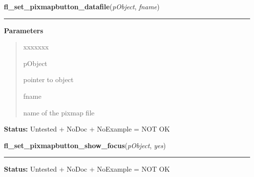     \vspace{0.5ex}

\hspace{.8\funcindent}\begin{boxedminipage}{\funcwidth}

    \raggedright \textbf{fl\_set\_pixmapbutton\_datafile}(\textit{pObject}, \textit{fname})

    \vspace{-1.5ex}

    \rule{\textwidth}{0.5\fboxrule}
\setlength{\parskip}{2ex}
\setlength{\parskip}{1ex}
      \textbf{Parameters}
      \vspace{-1ex}

      \begin{quote}
        \begin{Ventry}{xxxxxxx}

          \item[pObject]

          pointer to object

          \item[fname]

          name of the pixmap file

        \end{Ventry}

      \end{quote}

\textbf{Status:} Untested + NoDoc + NoExample = NOT OK



    \end{boxedminipage}

    \label{xformslib:library:fl_set_pixmapbutton_focus_outline}

    \vspace{0.5ex}

\hspace{.8\funcindent}\begin{boxedminipage}{\funcwidth}

    \raggedright \textbf{fl\_set\_pixmapbutton\_show\_focus}(\textit{pObject}, \textit{yes})

    \vspace{-1.5ex}

    \rule{\textwidth}{0.5\fboxrule}
\setlength{\parskip}{2ex}
\setlength{\parskip}{1ex}
\textbf{Status:} Untested + NoDoc + NoExample = NOT OK



    \end{boxedminipage}


